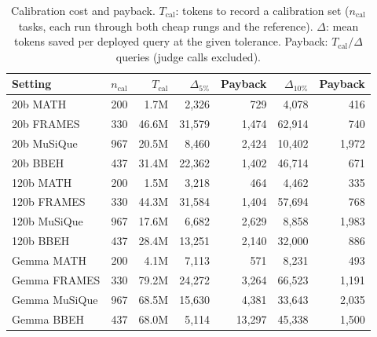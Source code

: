 \begin{table}[!t]
\centering
\scriptsize
\setlength{\tabcolsep}{3pt}

\begin{tabular}{@{}lrrrrrr@{}}
\toprule
Setting & $n_{\text{cal}}$ & $T_{\text{cal}}$ & $\Delta_{5\%}$ & Payback & $\Delta_{10\%}$ & Payback \\
\midrule
20b MATH & 200 & 1.7M & 2{,}326 & 729 & 4{,}078 & 416 \\
20b FRAMES & 330 & 46.6M & 31{,}579 & 1{,}474 & 62{,}914 & 740 \\
20b MuSiQue & 967 & 20.5M & 8{,}460 & 2{,}424 & 10{,}402 & 1{,}972 \\
20b BBEH & 437 & 31.4M & 22{,}362 & 1{,}402 & 46{,}714 & 671 \\
120b MATH & 200 & 1.5M & 3{,}218 & 464 & 4{,}462 & 335 \\
120b FRAMES & 330 & 44.3M & 31{,}584 & 1{,}404 & 57{,}694 & 768 \\
120b MuSiQue & 967 & 17.6M & 6{,}682 & 2{,}629 & 8{,}858 & 1{,}983 \\
120b BBEH & 437 & 28.4M & 13{,}251 & 2{,}140 & 32{,}000 & 886 \\
Gemma MATH & 200 & 4.1M & 7{,}113 & 571 & 8{,}231 & 493 \\
Gemma FRAMES & 330 & 79.2M & 24{,}272 & 3{,}264 & 66{,}523 & 1{,}191 \\
Gemma MuSiQue & 967 & 68.5M & 15{,}630 & 4{,}381 & 33{,}643 & 2{,}035 \\
Gemma BBEH & 437 & 68.0M & 5{,}114 & 13{,}297 & 45{,}338 & 1{,}500 \\
\bottomrule
\end{tabular}
\caption{Calibration cost and payback. $T_{\text{cal}}$: tokens to record a calibration set ($n_{\text{cal}}$ tasks, each run through both cheap rungs and the reference). $\Delta$: mean tokens saved per deployed query at the given tolerance. Payback: $T_{\text{cal}} / \Delta$ queries (judge calls excluded).}
\label{tab:r5}
\end{table}
